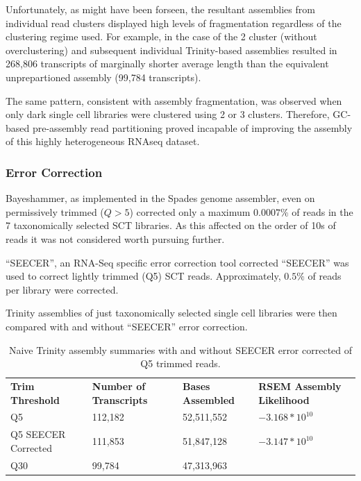 Unfortunately, as might have been forseen, the resultant assemblies from individual
read clusters displayed high levels of fragmentation regardless of the clustering
regime used.  For example, in the case of the 2 cluster (without overclustering) 
and subsequent individual Trinity-based assemblies resulted in 268,806 transcripts
of marginally shorter average length than the equivalent unprepartioned assembly
(99,784 transcripts).

The same pattern, consistent with assembly fragmentation, 
was observed when only dark single cell libraries were clustered using 
2 or 3 clusters. 
Therefore, GC-based pre-assembly read partitioning proved incapable of improving
the assembly of this highly heterogeneous RNAseq dataset.


\subsubsection{Error Correction}

Bayeshammer, as implemented in the Spades genome assembler, even on permissively trimmed
(\(Q>5\)) corrected only a maximum \(0.0007\%\) of reads in the 7 taxonomically selected SCT libraries.
As this affected on the order of 10s of reads it was not considered worth pursuing further.

``SEECER'', an RNA-Seq specific error correction tool corrected 
``SEECER'' was used to correct lightly trimmed (Q5) SCT reads.  
Approximately, \(0.5\%\) of reads per library were corrected.

Trinity assemblies of just taxonomically selected single cell libraries were
then compared with and without ``SEECER'' error correction.
\begin{table}[h]
     \begin{tabular}{@{}|l||l|l|l|@{}}
         \cmidrule(r){1-6} \cmidrule(l){8-8}
         \textbf{Trim Threshold} & \textbf{Number of Transcripts} & \textbf{Bases Assembled} & \textbf{RSEM Assembly Likelihood} \\
         \cmidrule{}
         Q5 &  112,182 & 52,511,552 & \(-3.168 * 10^{10}\) \\
         Q5 SEECER Corrected & 111,853 &  51,847,128 & \(-3.147*10^{10}\) \\
         Q30 & 99,784 & 47,313,963 &   \\ 
    \end{tabular}
    \caption{Naive Trinity assembly summaries with and without SEECER error corrected
        of Q5 trimmed reads. 
    }
    \label{tab:trim_assembly}
\end{table}

